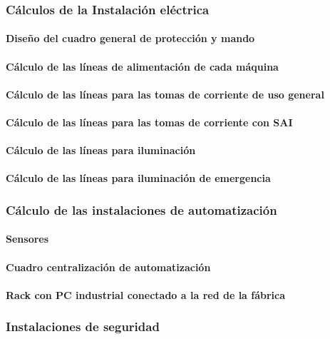 \subsubsection{Cálculos de la Instalación eléctrica}
\paragraph{Diseño del cuadro general de protección y mando}
\paragraph{Cálculo de las líneas de alimentación de cada máquina}
\paragraph{Cálculo de las líneas para las tomas de corriente de uso general}
\paragraph{Cálculo de las líneas para las tomas de corriente con SAI}
\paragraph{Cálculo de las líneas para iluminación}
\paragraph{Cálculo de las líneas para iluminación de emergencia}

\subsubsection{Cálculo de las instalaciones de automatización}
\paragraph{Sensores }
\paragraph{Cuadro centralización de automatización}
\paragraph{Rack con PC industrial conectado a la red de la fábrica}
\subsubsection{Instalaciones de seguridad}

